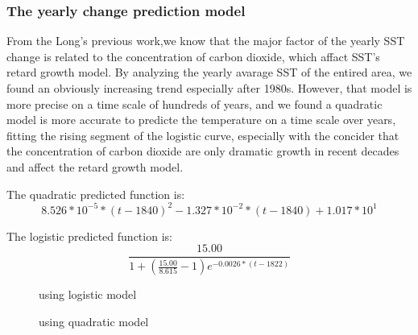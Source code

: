 \documentclass{mcmthesis}
\begin{document}
    

  \subsubsection{The yearly change prediction model}
    From the Long's previous work\cite{long2014fast},we know that the major factor of the yearly SST change is related to the concentration of carbon dioxide, which affact SST's retard growth model. By analyzing the yearly avarage SST of the entired area, we found an obviously increasing trend especially after 1980s. However, that model is more precise on a time scale of hundreds of years, and we found a quadratic model is more accurate to predicte the temperature on a time scale over years, fitting the rising segment of the logistic curve, especially with the concider that the concentration of carbon dioxide are only dramatic growth in recent decades and affect the retard growth model. 
   
    The quadratic predicted function is:
    \begin{equation}
        8.526*10^{-5}*(t-1840)^2-1.327*10^{-2}*(t-1840)+1.017*10^1
    \end{equation}

    The logistic predicted function is:
    \begin{equation}
      \frac{15.00}{1+(\frac{15.00}{8.615}-1)e^{-0.0026*(t-1822)}}
    \end{equation}

    \begin{figure}[htbp]
      \caption{using logistic model}\label{figure1}
    \end{figure}
    \begin{figure}[htbp]
      \caption{using quadratic model}\label{figure1}
    \end{figure}
    
\end{document}
